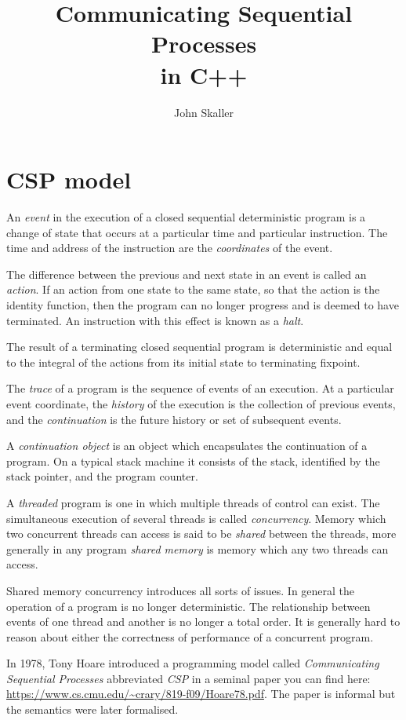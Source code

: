 \documentclass[oneside]{book}
\title{Communicating Sequential Processes\\ in C++}
\author{John Skaller}
\begin{document}
\maketitle
\tableofcontents
\chapter{CSP model}
An {\em event} in the execution of a closed sequential deterministic program is a 
change of state that occurs at a particular time and particular instruction. 
The time and address of the instruction are the {\em coordinates}
of the event. 

The difference between the previous and next state in an event
is called an {\em action}. If an action from one state to the same
state, so that the action is the identity function, then the program
can no longer progress and is deemed to have terminated. An instruction
with this effect is known as a {\em halt}.

The result of a terminating closed sequential
program is deterministic and equal to the integral of the actions from its
initial state to terminating fixpoint.

The {\em trace} of a program is the sequence of events of an execution.
At a particular event coordinate, the {\em history} of the execution is the 
collection of previous events, and the {\em continuation} is the future history
or set of subsequent events.

A {\em continuation object} is an object which encapsulates the continuation
of a program. On a typical stack machine it consists of the stack, identified
by the stack pointer, and the program counter.

A {\em threaded} program is one in which multiple threads of control can exist.
The simultaneous execution of several threads is called {\em concurrency}.
Memory which two concurrent threads can access is said to be {\em shared}
between the threads, more generally in any program {\em shared memory} is memory
which any two threads can access. 

Shared memory concurrency introduces all sorts of issues. In general the 
operation of a program is no longer deterministic. The relationship between
events of one thread and another is no longer a total order. It is generally
hard to reason about either the correctness of performance of a concurrent 
program.

In 1978, Tony Hoare introduced a programming model called {\em Communicating
Sequential Processes} abbreviated {\em CSP} in a seminal paper you can find here:
\url{https://www.cs.cmu.edu/~crary/819-f09/Hoare78.pdf}. The paper is informal but
the semantics were later formalised.
\end{document}
